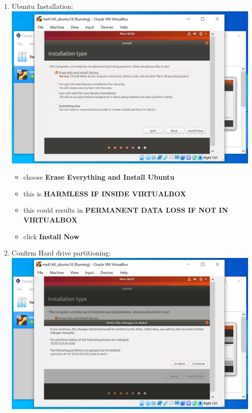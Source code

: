 \documentclass[12pt]{article}
\begin{document}
\begin{description}
\begin{description}
\begin{enumerate}[label=\alph*)]
\vspace{5mm} 
\newpage
\item Ubuntu Installation: \vspace{5mm} \\
      		\hspace*{-2.5cm}\includegraphics[scale=.6]{Capture16.png}\\
             \begin{itemize}
          \item choose {\bf Erase Everything and Install Ubuntu}
          \item this is {\bf HARMLESS IF INSIDE VIRTUALBOX }
          \item this could results in {\bf PERMANENT DATA LOSS IF NOT IN VIRTUALBOX}
          \item click {\bf Install Now}          
                 

            \end{itemize}

\vspace{5mm} 
\item Confirm Hard drive partitioning: \vspace{5mm} \\
      		\hspace*{-2.5cm}\includegraphics[scale=.6]{Capture17.png}
      		 \begin{itemize}
                    

\end{itemize}
\end{enumerate}
\end{description}
\end{description}
\end{document}
